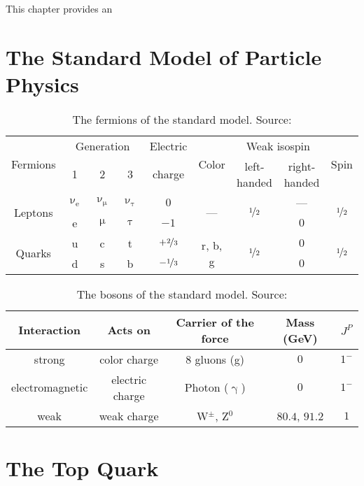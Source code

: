 This chapter provides an 
\section{The Standard Model of Particle Physics}
\begin{table}[h]
\caption[Fermions of the SM]{The fermions of the standard model. Source: \cite{povh}}
\label{tab:ch_1_sm_particles}
\begin{tabular}{ccccccccc}
\toprule
\multirow{2}{*}{Fermions} & \multicolumn{3}{c}{Generation} & {Electric} & \multirow{2}{*}{Color} & \multicolumn{2}{c}{Weak isospin} & \multirow{2}{*}{Spin}\\
& 1 & 2 & 3 & {charge} & & left-handed & right-handed & \\
\midrule
\multirow{2}{*}{Leptons} & $\upnu_\textrm{e}$ & $\upnu_\upmu$ & $\upnu_\uptau$ & {$0$} & \multirow{2}{*}{---} & \multirow{2}{*}{$\nicefrac{1}{2}$} & --- & \multirow{2}{*}{$\nicefrac{1}{2}$}\\
& e & $\upmu$ & $\uptau$ & {$-1$} & & & {$0$} &\\
\midrule
\multirow{2}{*}{Quarks} & u & c & t & $+\nicefrac{2}{3}$ & \multirow{2}{*}{r, b, g} & \multirow{2}{*}{$\nicefrac{1}{2}$} & {$0$} & \multirow{2}{*}{$\nicefrac{1}{2}$}\\
& d & s & b & $-\nicefrac{1}{3}$ & & & {$0$} & \\
\bottomrule
\end{tabular}
\end{table}

\begin{table}[h]
\caption[Bosons described by the SM]{The bosons of the standard model. Source: \cite{povh}}
\label{tab:ch_1_sm_bosons}
\begin{tabular}{ccccc}
\toprule
Interaction & Acts on & Carrier of the force & Mass (GeV) & {$J^P$}\\
\midrule
strong & color charge & 8 gluons (g) & {$0$} & {$1^-$}\\
electromagnetic & electric charge & Photon ($\upgamma$) & {$0$} & {$1^-$}\\
weak & weak charge & W$^{\pm}$, Z$^0$ & {$80.4$, $91.2$} & {$1$}\\
\bottomrule
\end{tabular}
\end{table}

\section{The Top Quark}
